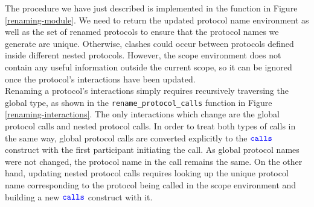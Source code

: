\documentclass[12pt,twoside]{report}
\begin{document}
The procedure we have just described is implemented in the \texttt{} function in Figure \ref{renaming-module}. We need to return the updated protocol name environment as well as the set of renamed protocols to ensure that the protocol names we generate are unique. Otherwise, clashes could occur between protocols defined inside different nested protocols. However, the scope environment does not contain any useful information outside the current scope, so it can be ignored once the protocol's interactions have been updated. \\

Renaming a protocol's interactions simply requires recursively traversing the global type, as shown in the \texttt{rename\_protocol\_calls} function in Figure \ref{renaming-interactions}. The only interactions which change are the global protocol calls and nested protocol calls. In order to treat both types of calls in the same way, global protocol calls are converted explicitly to the ${\color{blue}\mathtt{calls}}$ construct with the first participant initiating the call. As global protocol names were not changed, the protocol name in the call remains the same. On the other hand, updating nested protocol calls requires looking up the unique protocol name corresponding to the protocol being called in the scope environment and building a new ${\color{blue}\mathtt{calls}}$ construct with it.\\
\end{document}
